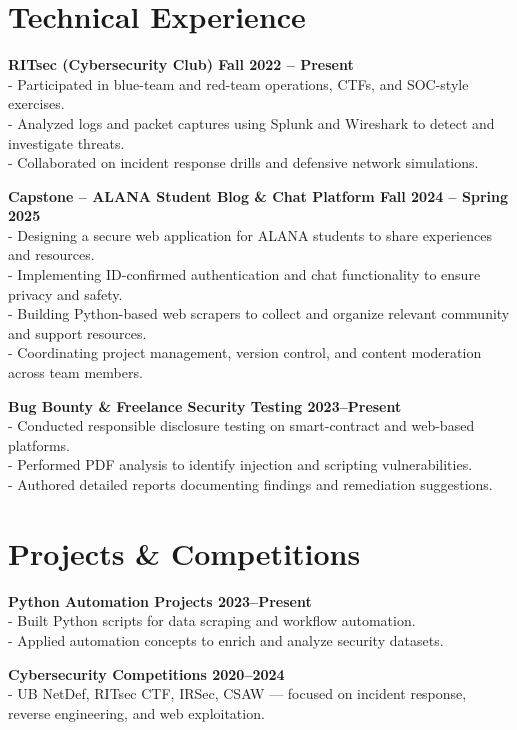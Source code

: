 \documentclass[11pt, letterpaper]{article}
\begin{document}
\section*{Technical Experience}
\textbf{RITsec (Cybersecurity Club) \hfill Fall 2022 – Present} \\
- Participated in blue-team and red-team operations, CTFs, and SOC-style exercises. \\
- Analyzed logs and packet captures using Splunk and Wireshark to detect and investigate threats. \\
- Collaborated on incident response drills and defensive network simulations.

\textbf{Capstone – ALANA Student Blog \& Chat Platform \hfill Fall 2024 – Spring 2025} \\
- Designing a secure web application for ALANA students to share experiences and resources. \\
- Implementing ID-confirmed authentication and chat functionality to ensure privacy and safety. \\
- Building Python-based web scrapers to collect and organize relevant community and support resources. \\
- Coordinating project management, version control, and content moderation across team members.

\textbf{Bug Bounty \& Freelance Security Testing \hfill 2023–Present} \\
- Conducted responsible disclosure testing on smart-contract and web-based platforms. \\
- Performed PDF analysis to identify injection and scripting vulnerabilities. \\
- Authored detailed reports documenting findings and remediation suggestions.

\section*{Projects \& Competitions}


\textbf{Python Automation Projects \hfill 2023–Present} \\
- Built Python scripts for data scraping and workflow automation. \\
- Applied automation concepts to enrich and analyze security datasets.

\textbf{Cybersecurity Competitions \hfill 2020–2024} \\
- UB NetDef, RITsec CTF, IRSec, CSAW — focused on incident response, reverse engineering, and web exploitation.
\end{document}
